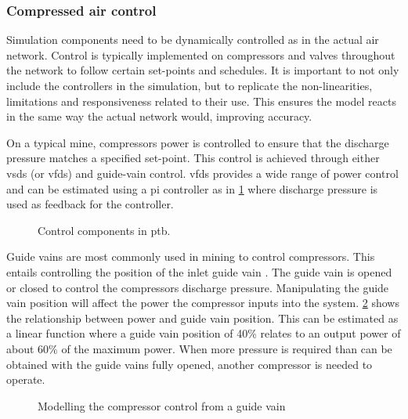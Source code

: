 		\subsubsection{Compressed air control}\label{Controllers}
			Simulation components need to be dynamically controlled as in the actual air network. Control is typically implemented on compressors and valves throughout the network to follow certain set-points and schedules. It is important to not only include the controllers in the simulation, but to replicate the non-linearities, limitations and responsiveness related to their use. This ensures the model reacts in the same way the actual network would, improving accuracy.
			\par 
			On a typical mine, compressors power is controlled to ensure that the discharge pressure matches a specified set-point. This control is achieved through either \glspl{vsd} (or \glspl{vfd}) and guide-vain control. \glspl{vfd} provides a wide range of power control and can be estimated using a \gls{pi} controller as in \cref{fig: Controller models} where discharge pressure is used as feedback for the controller. 
	\begin{figure}[h]
		\centering
		\caption[Control components in Process toolbox]{Control components in \gls{ptb}.}
		\label{fig: Controller models}
	\end{figure}
		Guide vains are most commonly used in mining to control compressors. This entails controlling the position of the inlet guide vain . The guide vain is opened or closed to control the compressors discharge pressure.  Manipulating the guide vain position will affect the power the compressor inputs into the system. \cref{fig: Guide vain position} shows the relationship between  power and guide vain position. This can be estimated as a linear function where a guide vain position of 40\% relates to an output power of about 60\% of the maximum power. When more pressure is required than can be obtained with the guide vains fully opened, another compressor is needed to operate. 
		\begin{figure}[h]
			\centering
			\fbox{}
			\caption{Modelling the compressor control from a guide vain}
			\label{fig: Guide vain position}
		\end{figure}
